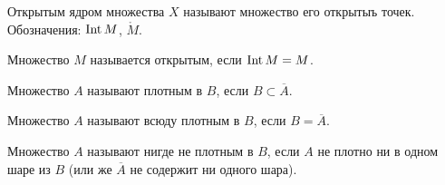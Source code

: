 \begin{Def}
    Открытым ядром множества $X$ называют множество его открытыъ точек. Обозначения: $\operatorname{Int} M$, $\mathring{M}$.
\end{Def}

\begin{Def}
    Множество $M$ называется открытым, если $\operatorname{Int} M = M$.
\end{Def}

\begin{Def}
    Множество $A$ называют плотным в $B$, если $B \subset \overline{A}$.
\end{Def}

\begin{Def}
    Множество $A$ называют всюду плотным в $B$, если $B = \overline{A}$.
\end{Def}

\begin{Def}
    Множество $A$ называют нигде не плотным в $B$, если $A$ не плотно ни в одном шаре из $B$ (или же $\overline{A}$ не содержит ни одного шара).
\end{Def}